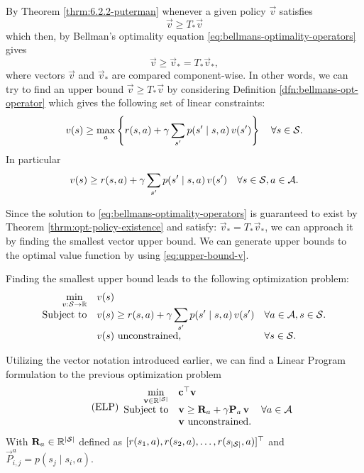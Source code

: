 By Theorem \ref{thrm:6.2.2-puterman} whenever a given policy $\vec{v}$ satisfies
\[
    \vec{v} \geq T_* \vec{v}
\]
which then, by Bellman's optimality equation
\eqref{eq:bellmans-optimality-operators} gives
\[
    \vec{v} \geq \vec{v}_* = T_* \vec{v}_*,
\]
where vectors $\vec{v}$ and $\vec{v}_*$ are compared component-wise. In other
words, we can try to find an upper bound $\vec{v} \geq T_{*} \vec{v}$ by
considering Definition \ref{dfn:bellmans-opt-operator} which gives the following
set of linear constraints:
\[
    v(s) \geq \max_{a} \left\{ r(s, a) + \gamma \sum_{s'} p(s' \mid s, a) \, v(s') \right\} \quad \forall s \in \mathcal{S}.
\]
In particular
\begin{equation}
    \label{eq:upper-bound-v}
    v(s) \geq r(s, a) + \gamma \sum_{s'} p(s' \mid s, a) \, v(s') \quad \forall s \in \mathcal{S}, a \in \mathcal{A}.
\end{equation}

Since the solution to \eqref{eq:bellmans-optimality-operators} is guaranteed to
exist by Theorem \ref{thrm:opt-policy-existence} and satisfy: $\vec{v}_* = T_*
\vec{v}_*$, we can approach it by finding the smallest vector upper bound.  We
can generate upper bounds to the optimal value function by using
\eqref{eq:upper-bound-v}.

Finding the smallest upper bound leads to the following optimization problem:
\begin{equation}
\begin{array}{rl@{}ll}
    \displaystyle \min_{v: \States \to \R} & v(s) \\
    \text{Subject to} & \displaystyle v(s) \geq r(s,a) + \gamma \sum_{s'} p(s' \mid s, a) \, v(s') & \quad \forall a \in \Actions, s \in \States. \\
    & v(s) \text{ unconstrained,} & \quad \forall s \in \States.
\end{array}
\end{equation}

Utilizing the vector notation introduced earlier, we can find a Linear Program formulation to the previous optimization problem
\begin{equation}
\label{lp:exact-lp}
\tag{ELP}
\begin{array}{rl@{}ll}
    \displaystyle \min_{\vec{v} \in \R^{|\States|}} & \vec{c}^{\top} \vec{v} \\
    \text{Subject to} & \vec{v} \geq \vec{R}_a + \gamma \vec{P}_a \, \vec{v} & \quad \forall a \in \Actions \\
    & \vec{v} \text{ unconstrained.} &
\end{array}
\end{equation}
With $\mathbf{R}_a \in \mathbb{R}^{|\mathcal{S}|}$ defined as $[r(s_1, a), r(s_2, a), \dots,
r(s_{|\mathcal{S}|}, a)]^{\top}$ and $\vec{P}_{i,j}^{a} = p(s_j \mid s_i, a)$.

